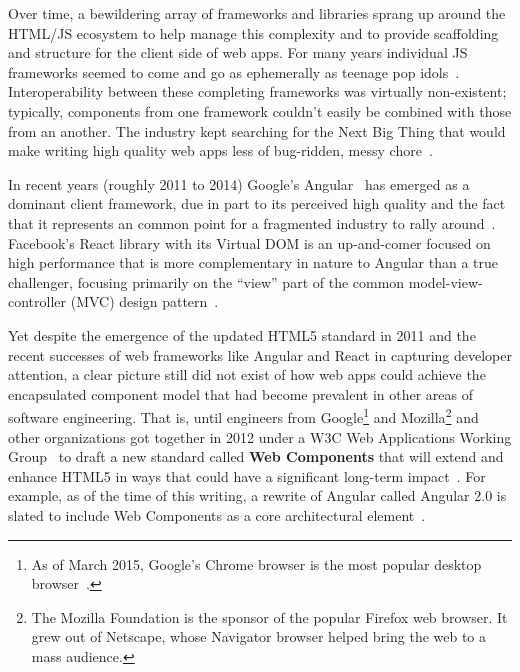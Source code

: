 Over time, a bewildering array of frameworks and libraries sprang up around the HTML/JS ecosystem to help manage this complexity and to provide scaffolding and structure for the client side of web apps.
For many years individual JS frameworks seemed to come and go as ephemerally as teenage pop idols~\cite{allenpike2015}. 
Interoperability between these completing frameworks was virtually non-existent; 
typically, components from one framework couldn't easily be combined with those from an another.
The industry kept searching for the Next Big Thing that would make writing high quality web apps less of bug-ridden, messy chore~\cite{allenpike2015}. 

In recent years (roughly 2011 to 2014) Google's Angular~\cite{googledevelopers2015-b}
has emerged as a dominant client framework, 
due in part to its perceived high quality and the fact that it represents an common point for a fragmented industry to rally around~\cite{dickey2014}.
Facebook's React library with its Virtual DOM is an up-and-comer focused on high performance that is more complementary in nature to Angular than a true challenger, 
focusing primarily on the ``view'' part of the common 
model-view-controller (MVC) 
design pattern~\cite{reactcontributors2015}.

Yet despite the emergence of the updated HTML5 standard in 2011 and the recent successes of web frameworks like Angular and React in capturing developer attention, 
a clear picture still did not exist of how web apps could achieve the encapsulated component model that had become prevalent in other areas of software engineering.
That is, until engineers from Google\footnote{
As of March 2015, Google's Chrome browser is the most popular desktop browser~\cite{zachte2015}.}
and Mozilla\footnote{
The Mozilla Foundation is the sponsor of the popular Firefox web browser. It grew out of Netscape, whose Navigator browser helped bring the web to a mass audience.}
and other organizations got together in 2012 under a W3C Web Applications Working Group~\cite{w3c2015} 
to draft a new standard called \textbf{Web Components} that will extend and enhance HTML5 in ways that could have a significant long-term impact~\cite{yveslafon2015}. 
For example, as of the time of this writing, a rewrite of Angular called Angular 2.0 is slated to include Web Components as a core architectural element~\cite{santiagoesteva2015}.


